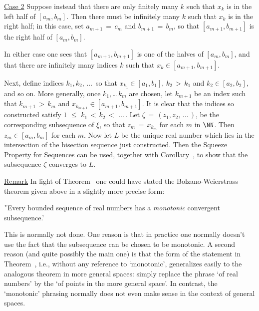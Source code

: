 {        \underline{Case 2} Suppose instead that there are only finitely many $k$ such that $x_{k}$ is in the left half of $[a_{m},b_{m}]$.
    Then there must be infinitely many $k$ such that $x_{k}$ is in the right half;
    in this case, set $a_{m+1} \,=\, c_{m}$ and $b_{m+1} \,=\, b_{m}$, so that $[a_{m+1},b_{m+1}]$ is the right half of $[a_{m},b_{m}]$.

        In either case one sees that $[a_{m+1},b_{m+1}]$ is one of the halves of $[a_{m},b_{m}]$,
    and that there are infinitely many indices $k$ such that $x_{k}{\in}[a_{m+1},b_{m+1}]$.

        Next, define indices $k_{1}, k_{2},\,{\ldots}\,$ so that $x_{k_{1}}{\in}[a_{1},b_{1}]$, $k_{2}\,>\,k_{1}$ and $k_{2}{\in}[a_{2},b_{2}]$, and so on.
    More generally, once $k_{1}$,\,{\ldots}\,$k_{m}$ are chosen, let $k_{m+1}$ be an index such that $k_{m+1}\,>\,k_{m}$ and $x_{k_{m+1}}{\in}[a_{m+1},b_{m+1}]$.
    It is clear that the indices so constructed satisfy $1\,\,{\leq}\,\,k_{1}\,<\,k_{2}\,<\,\,{\ldots}\,$.
    Let ${\zeta} \,=\, (z_{1},z_{2},\,{\ldots}\,)$, be the corresponding subsequence of ${\xi}$,
    so that $z_{m} \,=\, x_{k_{m}}$ for each $m$ in ${\NN}$.
    Then $z_{m}{\in}[a_{m},b_{m}]$ for each $m$.
    Now let $L$ be the unique real number which lies in the intersection of the bisection sequence just constructed.
    Then the Squeeze Property for Sequences can be used, together with Corollary~, to show that the subsequence ${\zeta}$ converges to $L$.


\V

        \underline{Remark} In light of Theorem~ one could have stated the Bolzano-Weierstrass theorem given above in a slightly more precise form:

        \h `Every bounded sequence of real numbers has a {\em monotonic} convergent subsequence.'

\noindent This is normally not done. One reason is that in practice one normally doesn't use the fact that the subsequence can be chosen to be monotonic.
    A second reason (and quite possibly the main one) is that the form of the statement in Theorem~,
    i.e., without any reference to `monotonic', generalizes easily to the analogous theorem in more general spaces:
    simply replace the phrase `of real numbers' by the `of points in the more general space'.
    In contrast, the `monotonic' phrasing normally does not even make sense in the context of general spaces.



}
